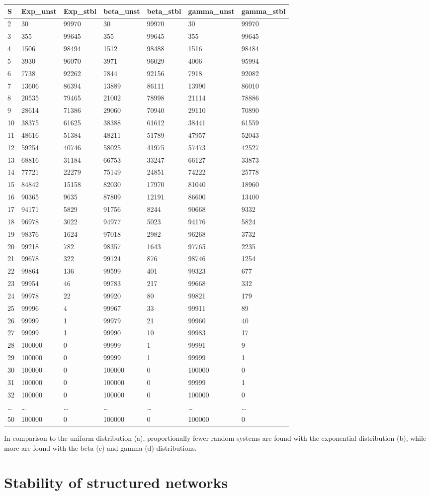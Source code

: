 \documentclass[]{article}
\begin{document}
\begin{longtable}[]{@{}lllllll@{}}
\toprule
S & Exp\_unst & Exp\_stbl & beta\_unst & beta\_stbl & gamma\_unst &
gamma\_stbl\tabularnewline
\midrule
\endhead
2 & 30 & 99970 & 30 & 99970 & 30 & 99970\tabularnewline
3 & 355 & 99645 & 355 & 99645 & 355 & 99645\tabularnewline
4 & 1506 & 98494 & 1512 & 98488 & 1516 & 98484\tabularnewline
5 & 3930 & 96070 & 3971 & 96029 & 4006 & 95994\tabularnewline
6 & 7738 & 92262 & 7844 & 92156 & 7918 & 92082\tabularnewline
7 & 13606 & 86394 & 13889 & 86111 & 13990 & 86010\tabularnewline
8 & 20535 & 79465 & 21002 & 78998 & 21114 & 78886\tabularnewline
9 & 28614 & 71386 & 29060 & 70940 & 29110 & 70890\tabularnewline
10 & 38375 & 61625 & 38388 & 61612 & 38441 & 61559\tabularnewline
11 & 48616 & 51384 & 48211 & 51789 & 47957 & 52043\tabularnewline
12 & 59254 & 40746 & 58025 & 41975 & 57473 & 42527\tabularnewline
13 & 68816 & 31184 & 66753 & 33247 & 66127 & 33873\tabularnewline
14 & 77721 & 22279 & 75149 & 24851 & 74222 & 25778\tabularnewline
15 & 84842 & 15158 & 82030 & 17970 & 81040 & 18960\tabularnewline
16 & 90365 & 9635 & 87809 & 12191 & 86600 & 13400\tabularnewline
17 & 94171 & 5829 & 91756 & 8244 & 90668 & 9332\tabularnewline
18 & 96978 & 3022 & 94977 & 5023 & 94176 & 5824\tabularnewline
19 & 98376 & 1624 & 97018 & 2982 & 96268 & 3732\tabularnewline
20 & 99218 & 782 & 98357 & 1643 & 97765 & 2235\tabularnewline
21 & 99678 & 322 & 99124 & 876 & 98746 & 1254\tabularnewline
22 & 99864 & 136 & 99599 & 401 & 99323 & 677\tabularnewline
23 & 99954 & 46 & 99783 & 217 & 99668 & 332\tabularnewline
24 & 99978 & 22 & 99920 & 80 & 99821 & 179\tabularnewline
25 & 99996 & 4 & 99967 & 33 & 99911 & 89\tabularnewline
26 & 99999 & 1 & 99979 & 21 & 99960 & 40\tabularnewline
27 & 99999 & 1 & 99990 & 10 & 99983 & 17\tabularnewline
28 & 100000 & 0 & 99999 & 1 & 99991 & 9\tabularnewline
29 & 100000 & 0 & 99999 & 1 & 99999 & 1\tabularnewline
30 & 100000 & 0 & 100000 & 0 & 100000 & 0\tabularnewline
31 & 100000 & 0 & 100000 & 0 & 99999 & 1\tabularnewline
32 & 100000 & 0 & 100000 & 0 & 100000 & 0\tabularnewline
\ldots{} & \ldots{} & \ldots{} & \ldots{} & \ldots{} & \ldots{} &
\ldots{}\tabularnewline
50 & 100000 & 0 & 100000 & 0 & 100000 & 0\tabularnewline
\bottomrule
\end{longtable}

In comparison to the uniform distribution (a), proportionally fewer
random systems are found with the exponential distribution (b), while
more are found with the beta (c) and gamma (d) distributions.

\hypertarget{structured}{\section{Stability of structured
networks}\label{structured}}
\end{document}
